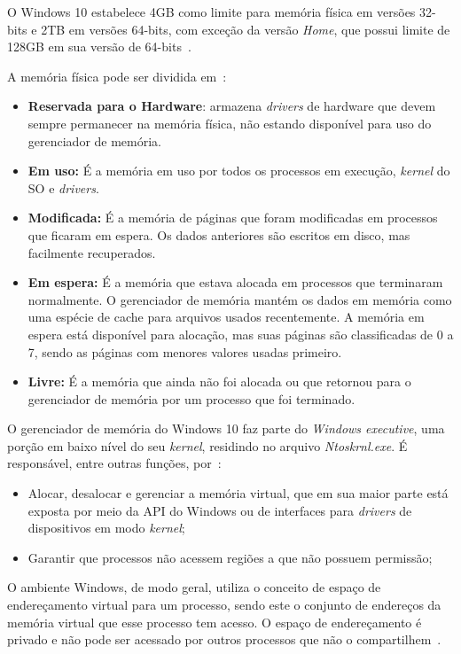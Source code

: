 O Windows 10 estabelece 4GB como limite para memória física em versões 32-bits e 2TB em versões 64-bits, com exceção da versão \emph{Home}, que possui limite de 128GB em sua versão de 64-bits~\cite{w10_memory}.
	
	A memória física pode ser dividida em~\cite{w10_memory}:
	\begin{itemize}
		\item \textbf{Reservada para o Hardware}: armazena \emph{drivers} de hardware que devem sempre permanecer na memória física, não estando disponível para uso do gerenciador de memória.
		
		\item \textbf{Em uso:} É a memória em uso por todos os processos em execução, \emph{kernel} do SO e \emph{drivers}.
		
		\item \textbf{Modificada:} É a memória de páginas que foram modificadas em processos que ficaram em espera. Os dados anteriores são escritos em disco, mas facilmente recuperados.
			
		\item \textbf{Em espera:} É a memória que estava alocada em processos que terminaram normalmente. O gerenciador de memória mantém os dados em memória como uma espécie de cache para arquivos usados recentemente. A memória em espera está disponível para alocação, mas suas páginas são classificadas de 0 a 7, sendo as páginas com menores valores usadas primeiro.
		
		\item \textbf{Livre:} É a memória que ainda não foi alocada ou que retornou para o gerenciador de memória por um processo que foi terminado.
	\end{itemize}

	O gerenciador de memória do Windows 10 faz parte do \emph{Windows executive}, uma porção em baixo nível do seu \emph{kernel}, residindo no arquivo \emph{Ntoskrnl.exe}. É responsável, entre outras funções, por~\cite{internals_pt2}:
	\begin{itemize}	
		\item Alocar, desalocar e gerenciar a memória virtual, que em sua maior parte está exposta por meio da API do Windows ou de interfaces para \emph{drivers} de dispositivos em modo \emph{kernel};
		\item Garantir que processos não acessem regiões a que não possuem permissão;
	\end{itemize}
	
	O ambiente Windows, de modo geral, utiliza o conceito de espaço de endereçamento virtual para um processo, sendo este o conjunto de endereços da memória virtual que esse processo tem acesso. O espaço de endereçamento é privado e não pode ser acessado por outros processos que não o compartilhem~\cite{internals_pt2}.
	
